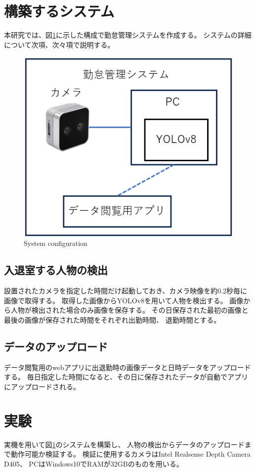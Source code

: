 \documentclass[10pt]{jarticle}
\begin{document}
    \section{構築するシステム}%
本研究では、図\ref{configuration}に示した構成で勤怠管理システムを作成する。
システムの詳細について次項、次々項で説明する。

\begin{figure}[!h]
\centering
\includegraphics[width=0.8\linewidth]{fig/system.png}
\caption{System configuration}
\label{configuration}
\end{figure}

    \subsection{入退室する人物の検出}
設置されたカメラを指定した時間だけ起動しておき、カメラ映像を約0.2秒毎に画像で取得する。
取得した画像からYOLOv8を用いて人物を検出する。
画像から人物が検出された場合のみ画像を保存する。
その日保存された最初の画像と最後の画像が保存された時間をそれぞれ出勤時間、
退勤時間とする。

    \subsection{データのアップロード}
データ閲覧用のwebアプリに出退勤時の画像データと日時データをアップロードする。
毎日指定した時間になると、その日に保存されたデータが自動でアプリにアップロードされる。


     
    \section{実験}%
実機を用いて図\ref{configuration}のシステムを構築し、
人物の検出からデータのアップロードまで動作可能か検証する。
検証に使用するカメラはIntel Realsense Depth Camera D405\cite{camera}、
PCはWindows10でRAMが32GBのものを用いる。
\end{document}
